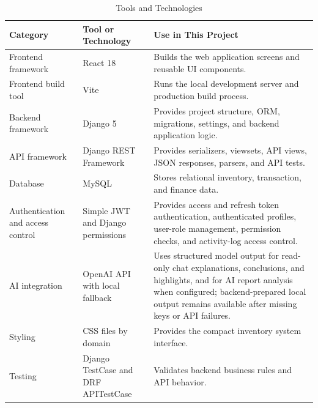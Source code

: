 \begin{table}[H]
	\centering
	\BlackbookTableSetup
	\caption{Tools and Technologies}
	\label{tab:tools-technologies}
	\begin{tabularx}{\textwidth}{|B{2.8cm}|B{3.2cm}|Z|}
		\hline
		\textbf{Category} & \textbf{Tool or Technology} & \textbf{Use in This Project} \\ \hline
		Frontend framework & React 18 & Builds the web application screens and reusable UI components. \\ \hline
		Frontend build tool & Vite & Runs the local development server and production build process. \\ \hline
		Backend framework & Django 5 & Provides project structure, ORM, migrations, settings, and backend application logic. \\ \hline
		API framework & Django REST Framework & Provides serializers, viewsets, API views, JSON responses, parsers, and API tests. \\ \hline
		Database & MySQL & Stores relational inventory, transaction, and finance data. \\ \hline
		Authentication and access control & Simple JWT and Django permissions & Provides access and refresh token authentication, authenticated profiles, user-role management, permission checks, and activity-log access control. \\ \hline
		AI integration & OpenAI API with local fallback & Uses structured model output for read-only chat explanations, conclusions, and highlights, and for AI report analysis when configured; backend-prepared local output remains available after missing keys or API failures. \\ \hline
		Styling & CSS files by domain & Provides the compact inventory system interface. \\ \hline
		Testing & Django TestCase and DRF APITestCase & Validates backend business rules and API behavior. \\ \hline
	\end{tabularx}
\end{table}
